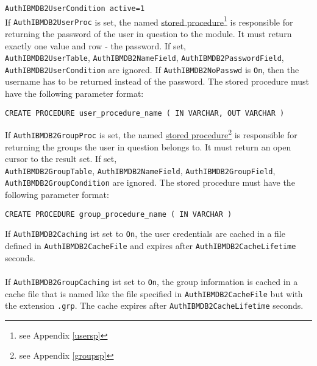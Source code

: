 \documentclass[11pt,letterpaper]{article}
\begin{document}
{\tt AuthIBMDB2UserCondition active=1}\\
\newpage
\noindent
If {\tt AuthIBMDB2UserProc} is set, the named \hyperlink{husersp}{stored procedure}\footnote{see Appendix \ref{usersp}} is responsible for returning the password of the user in question to the module. It must return exactly one value and row - the password. If set,\\ {\tt AuthIBMDB2UserTable}, {\tt AuthIBMDB2NameField}, {\tt AuthIBMDB2PasswordField}, {\tt AuthIBMDB2UserCondition} are ignored. If {\tt AuthIBMDB2NoPasswd} is {\tt On}, then the username has to be returned instead of the password. The stored procedure must have the following parameter format:
\begin{verbatim}
CREATE PROCEDURE user_procedure_name ( IN VARCHAR, OUT VARCHAR )
\end{verbatim}
If {\tt AuthIBMDB2GroupProc} is set, the named \hyperlink{hgroupsp}{stored procedure}\footnote{see Appendix \ref{groupsp}} is responsible for returning the groups the user in question belongs to. It must return an open cursor to the result set. If set,\\ {\tt AuthIBMDB2GroupTable}, {\tt AuthIBMDB2NameField}, {\tt AuthIBMDB2GroupField}, {\tt AuthIBMDB2GroupCondition} are ignored. The stored procedure must have the following parameter format:
\begin{verbatim}
CREATE PROCEDURE group_procedure_name ( IN VARCHAR )
\end{verbatim}
If {\tt AuthIBMDB2Caching} ist set to {\tt On}, the user credentials are cached in a file defined in {\tt AuthIBMDB2CacheFile} and expires after {\tt AuthIBMDB2CacheLifetime} seconds.\\
\\
If {\tt AuthIBMDB2GroupCaching} ist set to {\tt On}, the group information is cached in a cache file that is named like the file specified in {\tt AuthIBMDB2CacheFile} but with the extension {\tt .grp}. The cache expires after {\tt AuthIBMDB2CacheLifetime} seconds.
\newpage
\end{document}
